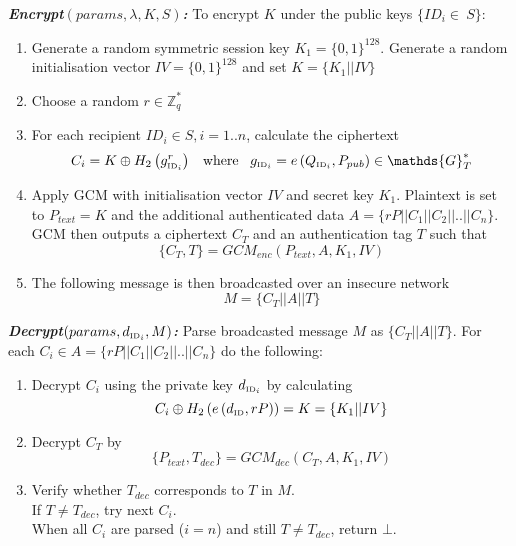 \documentclass[11pt]{article}
\begin{document}
\textbf{\textit{Encrypt$\left( params, \lambda, K, S \right)$:}} To encrypt $K$ under the public keys $\{ ID_i \in \ S \}$:
\begin{enumerate}
 \item Generate a random symmetric session key $K_1 = \{ 0,1 \}^{128}$. Generate a random initialisation vector $IV = \{ 0,1 \}^{128}$ and set $K = \{ K_1 || IV \}$
 \item Choose a random $r \in \mathds{Z}_q^{*}$
 \item For each recipient $ID_i \in S, i = 1..n$, calculate the ciphertext
 \begin{equation*}
  C_i = K \oplus H_2 \left( g_{{\textrm{\tiny{ID}}_i}}^r \right) \; \; \; \textrm{where} \; \; \; g_{\textrm{\tiny{ID}}_i} = e \left( Q_{\textrm{\tiny{ID}}_i}, P_{pub} \right) \in \mathds{G}_T^{*}
 \end{equation*}
 
 \item Apply GCM with initialisation vector $IV$ and secret key $K_1$. Plaintext is set to $P_{text} = K$ and the additional authenticated data $A = \{ rP || C_1 || C_2 || .. || C_n \}$. GCM then outputs a ciphertext $C_T$ and an authentication tag $T$ such that
 \begin{equation*}
  \{ C_T, T \} = GCM_{enc} \left( P_{text}, A, K_1, IV \right)
 \end{equation*}
 
 \item The following message is then broadcasted over an insecure network
 \begin{equation*}
  M = \{ C_T || A || T\}
 \end{equation*}
\end{enumerate}

\newpage
\textbf{\textit{Decrypt$\left( params, d_{\textrm{\tiny{ID}}_i}, M \right)$:}} Parse broadcasted message $M$ as $\{ C_T || A || T\}$. For each $C_i \in A = \{ rP || C_1 || C_2 || .. || C_n \}$ do the following:
\begin{enumerate}
  \item Decrypt $C_i$ using the private key $d_{\textrm{\tiny{ID}}_i}$ by calculating
  \begin{equation*}
   C_i \oplus H_2 \left( e\left( d_{\textrm{\tiny{ID}}}, rP\right) \right) = K = \{ K_1 || IV \}
  \end{equation*}
  
 \item Decrypt $C_T$ by
  \begin{equation*}
   \{ P_{text}, T_{dec} \} = GCM_{dec} \left( C_T, A, K_1, IV \right)
  \end{equation*}
  
 \item Verify whether $T_{dec}$ corresponds to $T$ in $M$.\\ If $T \neq T_{dec}$, try next $C_i$. \\ When all $C_i$ are parsed ($i = n$) and still $T \neq T_{dec}$, return $\bot$.

\end{enumerate}
\end{document}
